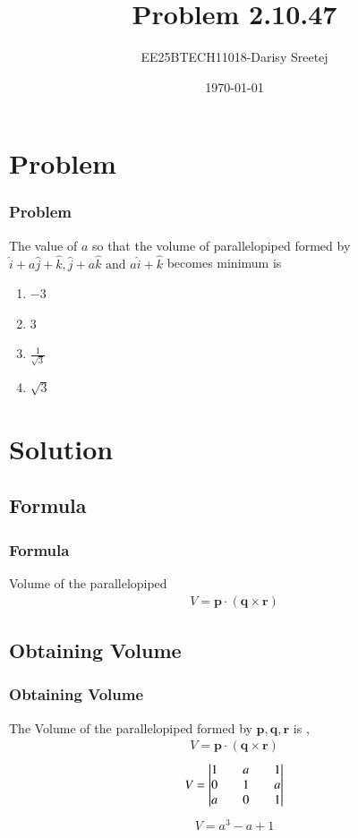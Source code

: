 \documentclass{beamer}
\title{Problem 2.10.47}
\author{EE25BTECH11018-Darisy Sreetej}
\date{\today}
\theoremstyle{remark}
\let\vec\mathbf
\numberwithin{equation}{section}
\begin{document}
\begin{frame}
\titlepage
\end{frame}


\section{Problem}

\begin{frame}
\frametitle{Problem}
The value of $a$ so that the volume of parallelopiped formed by $\hat{i} + a\hat{j} + \hat{k}, \hat{j} + a\hat{k} \text{ and } a\hat{i} + \hat{k}$ becomes minimum is
\begin{enumerate}
\item $-3$
\item $3$
\item $\frac{1}{\sqrt{3}}$
\item $\sqrt{3}$
\end{enumerate}
\end{frame}
\section{Solution}

\subsection{Formula}
\setcounter{section}{1}
\begin{frame}
\frametitle{Formula}
Volume of the parallelopiped
\begin{align*}
 V=\vec{p} \cdot (\vec{q} \times \vec{r}) 
\end{align*}
\end{frame}
\subsection{Obtaining Volume}
\begin{frame}
\frametitle{Obtaining Volume}
The Volume of the parallelopiped formed by $\vec{p},\vec{q},\vec{r}$ is ,
\begin{align}
    V = \vec{p}\cdot(\vec{q}\times\vec{r})
\end{align}
\begin{align}
V=\begin{vmatrix}
    1 && a && 1\\
    0 && 1 && a\\
    a && 0 && 1
    \end{vmatrix}
\end{align}
\begin{align}
    V=a^3-a+1
\end{align}


\end{frame}
\end{document}
